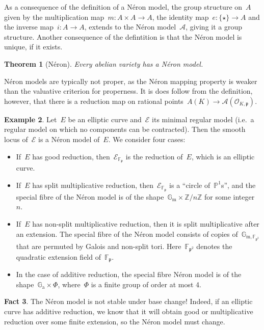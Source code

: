 \documentclass[12pt]{article}
\newtheorem{theorem}{Theorem}[section]
\theoremstyle{definition}
\newtheorem{fact}[theorem]{Fact}
\newtheorem{example}[theorem]{Example}
\numberwithin{equation}{subsection}
\newcommand{\Z}{\ensuremath{\mathbb{Z}}}
\newcommand{\F}{\ensuremath{\mathbb{F}}}
\begin{document}
As a consequence of the definition of a N\'eron model, the group structure on~$A$ given by the multiplication map~$m \colon A \times A \to A$, the identity map~$e \colon \{\star\} \to A$ and the inverse map~$i \colon A \to A$, extends to the N\'eron model~$\mathcal{A}$, giving it a group structure. Another consequence of the defintition is that the N\'eron model is unique, if it exists.

\begin{theorem}[N\'eron]
Every abelian variety has a N\'eron model.
\end{theorem}

N\'eron models are typically not proper, as the N\'eron mapping property is weaker than the valuative criterion for properness.
It is does follow from the definition, however, that there is a reduction map on rational points~$A(K) \to \mathcal{A}(\mathcal{O}_{K,\mathfrak{p}})$.

\begin{example}
Let~$E$ be an elliptic curve and~$\mathcal{E}$ its minimal regular model (i.e.\ a regular model on which no components can be contracted).
Then the smooth locus of~$\mathcal{E}$ is a N\'eron model of~$E$. We consider four cases:\\[-0.7cm]
\begin{itemize}\itemsep0pt
\item If~$E$ has good reduction, then~$\mathcal{E}_{\F_\mathfrak{p}}$ is the reduction of~$E$, which is an elliptic curve.
\item If~$E$ has split multiplicative reduction, then~$\mathcal{E}_{\F_\mathfrak{p}}$ is a ``circle of~$\mathbb{P}^1$s'', and the special fibre of the N\'eron model is of the shape~$\mathbb{G}_{\mathrm{m}} \times \Z/n\Z$ for some integer~$n$.
\item If~$E$ has non-split multiplicative reduction, then it is split multiplicative after an extension. The special fibre of the N\'eron model consists of copies of~$\mathbb{G}_{\mathrm{m}, \mathbb{F}_{\mathfrak{p}^2}}$ that are permuted by Galois and non-split tori. Here~$\mathbb{F}_{\mathfrak{p}^2}$ denotes the quadratic extension field of~$\mathbb{F}_{\mathfrak{p}}$.
\item In the case of additive reduction, the special fibre N\'eron model is of the shape~$\mathbb{G}_{\mathrm{a}} \times \Phi$, where~$\Phi$ is a finite group of order at most 4.
\end{itemize}
\end{example}

\begin{fact}
The N\'eron model is not stable under base change! Indeed, if an elliptic curve has additive reduction, we know that it will obtain good or multiplicative reduction over some finite extension, so the N\'eron model must change.
\end{fact}
\end{document}
